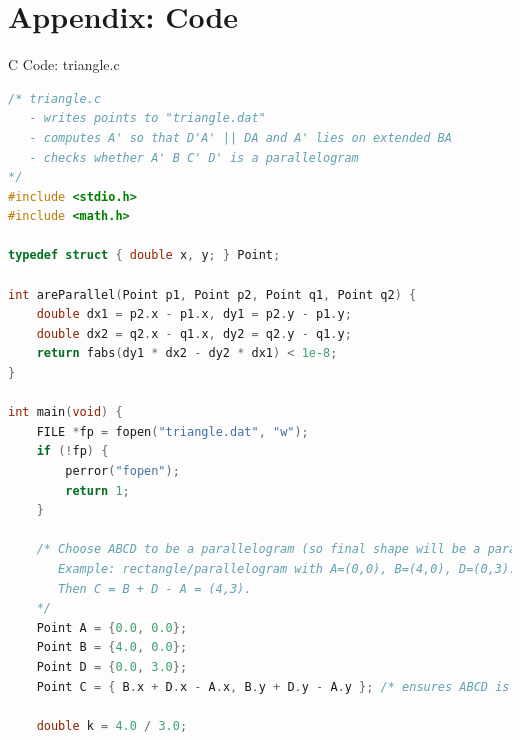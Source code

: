 \documentclass{beamer}
\numberwithin{equation}{section}
\theoremstyle{remark}
\begin{document}
\section*{Appendix: Code}

\begin{frame}[fragile]{C Code: triangle.c}
\begin{lstlisting}[language=C]
/* triangle.c
   - writes points to "triangle.dat"
   - computes A' so that D'A' || DA and A' lies on extended BA
   - checks whether A' B C' D' is a parallelogram
*/
#include <stdio.h>
#include <math.h>

typedef struct { double x, y; } Point;

int areParallel(Point p1, Point p2, Point q1, Point q2) {
    double dx1 = p2.x - p1.x, dy1 = p2.y - p1.y;
    double dx2 = q2.x - q1.x, dy2 = q2.y - q1.y;
    return fabs(dy1 * dx2 - dy2 * dx1) < 1e-8;
}

int main(void) {
    FILE *fp = fopen("triangle.dat", "w");
    if (!fp) {
        perror("fopen");
        return 1;
    }

    /* Choose ABCD to be a parallelogram (so final shape will be a parallelogram).
       Example: rectangle/parallelogram with A=(0,0), B=(4,0), D=(0,3).
       Then C = B + D - A = (4,3).
    */
    Point A = {0.0, 0.0};
    Point B = {4.0, 0.0};
    Point D = {0.0, 3.0};
    Point C = { B.x + D.x - A.x, B.y + D.y - A.y }; /* ensures ABCD is parallelogram */

    double k = 4.0 / 3.0;
\end{lstlisting}
\end{frame}
\end{document}
